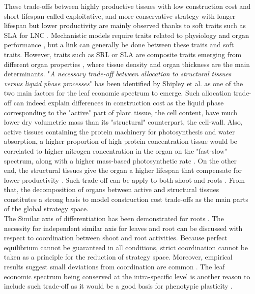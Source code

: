 These trade-offs between highly productive tissues with low construction cost and short lifespan called exploitative, and more conservative strategy with longer lifespan but lower productivity are mainly observed thanks to soft traits such as SLA for LNC \cite{wright_worldwide_2004}. Mechanistic models require traits related to physiology and organ performance \cite{soussana_gemini:_2012, lohier_explaining_2014}, but a link can generally be done between these traits and soft traits. However, traits such as SRL or SLA are composite traits emerging from different organ properties \cite{ryser_importance_1996,john_anatomical_2017}, where tissue density and organ thickness are the main determinants. "\textit{A necessary trade-off between allocation to structural tissues versus liquid phase processes}" has been identified by Shipley et al. \cite{shipley_fundamental_2006} as one of the two main factors for the leaf economic spectrum to emerge. Such allocation trade-off can indeed explain differences in construction cost as the liquid phase corresponding to the "active" part of plant tissue, the cell content, have much lower dry volumetric mass than its "structural" counterpart, the cell-wall. Also, active tissues containing the protein machinery for photosynthesis and water absorption, a higher proportion of high protein concentration tissue would be correlated to higher nitrogen concentration in the organ on the "fast-slow" spectrum, along with a higher mass-based photosynthetic rate \cite{reich_world-wide_2014}. On the other end, the structural tissues give the organ a higher lifespan \cite{mediavilla_internal_2001, ryser_importance_1996} that compensate for lower productivity \cite{westoby_time_2000}. Such trade-off can be apply to both shoot and roots \cite{craine_functional_2002, tjoelker_linking_2005, reich_world-wide_2014}. From that, the decomposition of organs between active and structural tissues constitutes a strong basis to model construction cost trade-offs as the main parts of the global strategy space.\\

The Similar axis of differentiation has been demonstrated for roots \cite{ reich_world-wide_2014, tjoelker_linking_2015}. The necessity for independent similar axis for leaves and root can be discussed with respect to coordination between shoot and root activities. Because perfect equilibrium cannot be guaranteed in all conditions, strict coordination cannot be taken as a principle for the reduction of strategy space. Moreover, empirical results suggest small deviations from coordination are common \cite{freschet_explaining_2015}. The leaf economic spectrum being conserved at the intra-specific level \cite{ hu_novel_2015} is another reason to include such trade-off as it would be a good basis for phenotypic plasticity \cite{freschet_plasticity_2013}.\\


